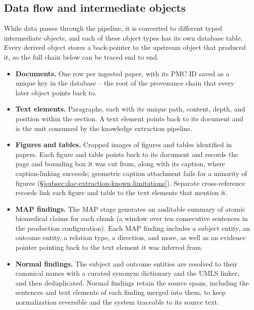\subsection{Data flow and intermediate objects}\label{subsec:data-flow-and-intermediate-objects}

While data passes through the pipeline, it is converted to different typed intermediate objects, and each of these object types has its own database table. Every derived object stores a back-pointer to the upstream object that produced it, so the full chain below can be traced end to end.

\begin{itemize}[label={}, leftmargin=1.5em, itemsep=0.4em]
    \item \textbf{Documents.} One row per ingested paper, with its PMC ID saved as a unique key in the database -- the root of the provenance chain that every later object points back to.

    \item \textbf{Text elements.} Paragraphs, each with its unique path, content, depth, and position within the section. A text element points back to its document and is the unit consumed by the knowledge extraction pipeline.
    
    \item \textbf{Figures and tables.} Cropped images of figures and tables identified in papers. Each figure and table points back to its document and records the page and bounding box it was cut from, along with its caption, where caption-linking succeeds; geometric caption attachment fails for a minority of figures (§\ref{subsec:doc-extraction-known-limitations}). Separate cross-reference records link each figure and table to the text elements that mention it.

    \item \textbf{MAP findings.} The MAP stage generates an auditable summary of atomic biomedical claims for each chunk (a window over ten consecutive sentences in the production configuration). Each MAP finding includes a subject entity, an outcome entity, a relation type, a direction, and more, as well as an evidence pointer pointing back to the text element it was inferred from.

    \item \textbf{Normal findings.} The subject and outcome entities are resolved to their canonical names with a curated synonym dictionary and the UMLS linker, and then deduplicated. Normal findings retain the source spans, including the sentences and text elements of each finding merged into them, to keep normalization reversible and the system traceable to its source text. 


\end{itemize}
